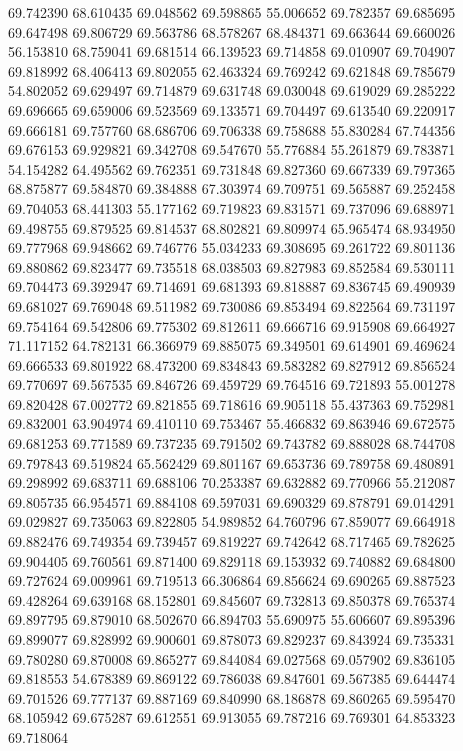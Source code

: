 69.742390
68.610435
69.048562
69.598865
55.006652
69.782357
69.685695
69.647498
69.806729
69.563786
68.578267
68.484371
69.663644
69.660026
56.153810
68.759041
69.681514
66.139523
69.714858
69.010907
69.704907
69.818992
68.406413
69.802055
62.463324
69.769242
69.621848
69.785679
54.802052
69.629497
69.714879
69.631748
69.030048
69.619029
69.285222
69.696665
69.659006
69.523569
69.133571
69.704497
69.613540
69.220917
69.666181
69.757760
68.686706
69.706338
69.758688
55.830284
67.744356
69.676153
69.929821
69.342708
69.547670
55.776884
55.261879
69.783871
54.154282
64.495562
69.762351
69.731848
69.827360
69.667339
69.797365
68.875877
69.584870
69.384888
67.303974
69.709751
69.565887
69.252458
69.704053
68.441303
55.177162
69.719823
69.831571
69.737096
69.688971
69.498755
69.879525
69.814537
68.802821
69.809974
65.965474
68.934950
69.777968
69.948662
69.746776
55.034233
69.308695
69.261722
69.801136
69.880862
69.823477
69.735518
68.038503
69.827983
69.852584
69.530111
69.704473
69.392947
69.714691
69.681393
69.818887
69.836745
69.490939
69.681027
69.769048
69.511982
69.730086
69.853494
69.822564
69.731197
69.754164
69.542806
69.775302
69.812611
69.666716
69.915908
69.664927
71.117152
64.782131
66.366979
69.885075
69.349501
69.614901
69.469624
69.666533
69.801922
68.473200
69.834843
69.583282
69.827912
69.856524
69.770697
69.567535
69.846726
69.459729
69.764516
69.721893
55.001278
69.820428
67.002772
69.821855
69.718616
69.905118
55.437363
69.752981
69.832001
63.904974
69.410110
69.753467
55.466832
69.863946
69.672575
69.681253
69.771589
69.737235
69.791502
69.743782
69.888028
68.744708
69.797843
69.519824
65.562429
69.801167
69.653736
69.789758
69.480891
69.298992
69.683711
69.688106
70.253387
69.632882
69.770966
55.212087
69.805735
66.954571
69.884108
69.597031
69.690329
69.878791
69.014291
69.029827
69.735063
69.822805
54.989852
64.760796
67.859077
69.664918
69.882476
69.749354
69.739457
69.819227
69.742642
68.717465
69.782625
69.904405
69.760561
69.871400
69.829118
69.153932
69.740882
69.684800
69.727624
69.009961
69.719513
66.306864
69.856624
69.690265
69.887523
69.428264
69.639168
68.152801
69.845607
69.732813
69.850378
69.765374
69.897795
69.879010
68.502670
66.894703
55.690975
55.606607
69.895396
69.899077
69.828992
69.900601
69.878073
69.829237
69.843924
69.735331
69.780280
69.870008
69.865277
69.844084
69.027568
69.057902
69.836105
69.818553
54.678389
69.869122
69.786038
69.847601
69.567385
69.644474
69.701526
69.777137
69.887169
69.840990
68.186878
69.860265
69.595470
68.105942
69.675287
69.612551
69.913055
69.787216
69.769301
64.853323
69.718064
